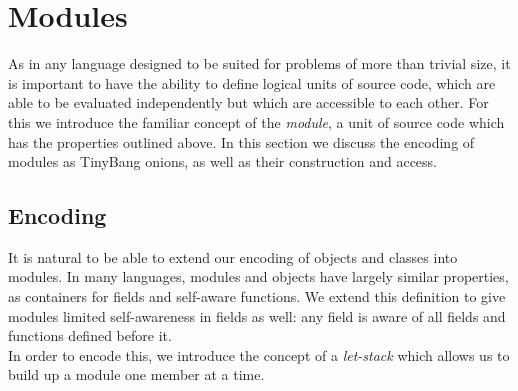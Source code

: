 \documentclass{llncs}
\newcommand{\translate}[2]{\ensuremath{\llbracket\texttt{#2}\rrbracket_{\textnormal{#1}}}}
\begin{document}
\section{Modules}
\label{sec-modules}
\indent As in any language designed to be suited for problems of more than trivial size, it is important to have the ability to define logical units of source code, which are able to be evaluated independently but which are accessible to each other. For this we introduce the familiar concept of the \textit{module}, a unit of source code which has the properties outlined above. In this section we discuss the encoding of modules as TinyBang onions, as well as their construction and access.

\subsection{Encoding}
\label{ss-mod-encoding}
%
% 
\indent It is natural to be able to extend our encoding of objects and classes into modules. In many languages, modules and objects have largely similar properties, as containers for fields and self-aware functions. We extend this definition to give modules limited self-awareness in fields as well: any field is aware of all fields and functions defined before it.\\
\indent In order to encode this, we introduce the concept of a \textit{let-stack} which allows us to build up a module one member at a time.
\end{document}
